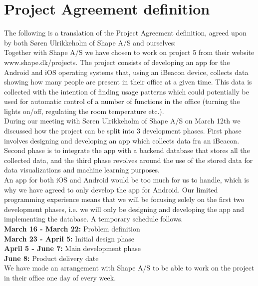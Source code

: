 \documentclass[12pt]{article}
\begin{document}
\newpage
\section{Project Agreement definition}

The following is a translation of the Project Agreement definition, agreed upon by both S\o ren Ulrikkeholm of Shape A/S and ourselves:\\

Together with Shape A/S we have chosen to work on project 5 from their website www.shape.dk/projects. The project consists of developing an app for the Android and iOS operating systems that, using an iBeacon device, collects data showing how many people are present in their office at a given time. This data is collected with the intention of finding usage patterns which could potentially be used for automatic control of a number of functions in the office (turning the lights on/off, regulating the room temperature etc.).\\

During our meeting with S\o ren Ulrikkeholm of Shape A/S on March 12th we discussed how the project can be split into 3 development phases. First phase involves designing and developing an app which collects data fra an iBeacon. Second phase is to integrate the app with a backend database that stores all the collected data, and the third phase revolves around the use of the stored data for data visualizations and machine learning purposes.\\

An app for both iOS and Android would be too much for us to handle, which is why we have agreed to only develop the app for Android. Our limited programming experience means that we will be focusing solely on the first two development phases, i.e. we will only be designing and developing the app and implementing the database. A temporary schedule follows.\\

\textbf{March 16 - March 22:} Problem definition\\
\textbf{March 23 - April 5:} Initial design phase\\
\textbf{April 5 - June 7:} Main development phase\\
\textbf{June 8:} Product delivery date\\

We have made an arrangement with Shape A/S to be able to work on the project in their office one day of every week.\\
\end{document}
